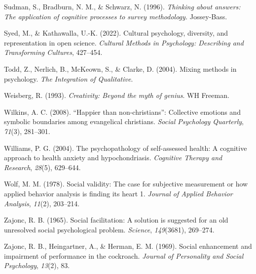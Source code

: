 \documentclass[
]{krantz}
\newlength{\cslhangindent}
\newenvironment{CSLReferences}[2] %
 {\begin{list}{}{%
  \setlength{\itemindent}{0pt}
  \setlength{\leftmargin}{0pt}
  \setlength{\parsep}{0pt}
  \ifodd #1
   \setlength{\leftmargin}{\cslhangindent}
   \setlength{\itemindent}{-1\cslhangindent}
  \fi
  \setlength{\itemsep}{#2\baselineskip}}}
 {\end{list}}
\begin{document}
\begin{CSLReferences}{1}{0}
Sudman, S., Bradburn, N. M., \& Schwarz, N. (1996). \emph{Thinking about answers: The application of cognitive processes to survey methodology.} Jossey-Bass.

Syed, M., \& Kathawalla, U.-K. (2022). Cultural psychology, diversity, and representation in open science. \emph{Cultural Methods in Psychology: Describing and Transforming Cultures}, 427--454.

Todd, Z., Nerlich, B., McKeown, S., \& Clarke, D. (2004). Mixing methods in psychology. \emph{The Integration of Qualitative}.

Weisberg, R. (1993). \emph{Creativity: Beyond the myth of genius}. WH Freeman.

Wilkins, A. C. (2008). {``Happier than non-christians''}: Collective emotions and symbolic boundaries among evangelical christians. \emph{Social Psychology Quarterly}, \emph{71}(3), 281--301.

Williams, P. G. (2004). The psychopathology of self-assessed health: A cognitive approach to health anxiety and hypochondriasis. \emph{Cognitive Therapy and Research}, \emph{28}(5), 629--644.

Wolf, M. M. (1978). Social validity: The case for subjective measurement or how applied behavior analysis is finding its heart 1. \emph{Journal of Applied Behavior Analysis}, \emph{11}(2), 203--214.

Zajonc, R. B. (1965). Social facilitation: A solution is suggested for an old unresolved social psychological problem. \emph{Science}, \emph{149}(3681), 269--274.

Zajonc, R. B., Heingartner, A., \& Herman, E. M. (1969). Social enhancement and impairment of performance in the cockroach. \emph{Journal of Personality and Social Psychology}, \emph{13}(2), 83.

\end{CSLReferences}
\end{document}
